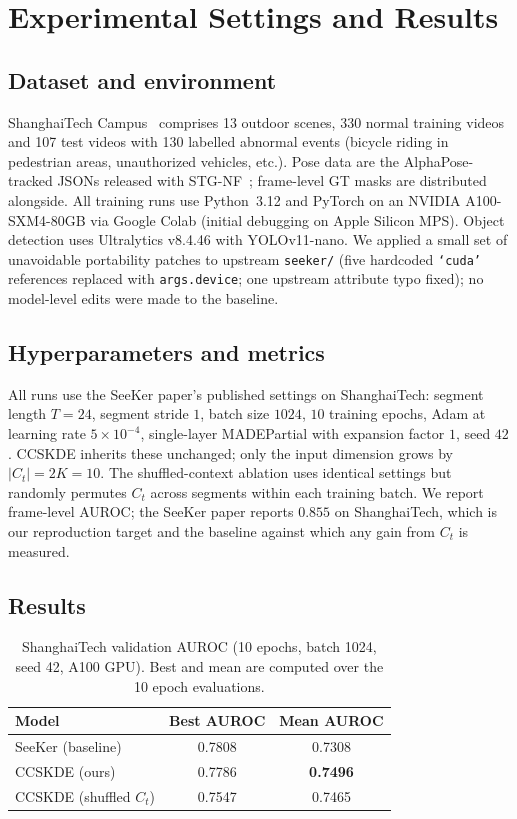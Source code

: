 \documentclass{article}
\begin{document}
\section{Experimental Settings and Results}
\label{sec:experiments}

\subsection{Dataset and environment}
ShanghaiTech Campus~\citep{liu2018future} comprises 13 outdoor scenes,
330 normal training videos and 107 test videos with 130 labelled abnormal
events (bicycle riding in pedestrian areas, unauthorized vehicles, etc.).
Pose data are the AlphaPose-tracked JSONs released with
STG-NF~\citep{hirschorn2023normalizing}; frame-level GT masks are
distributed alongside. All training runs use Python~3.12 and PyTorch on
an NVIDIA A100-SXM4-80GB via Google Colab (initial debugging on Apple
Silicon MPS). Object detection uses Ultralytics v8.4.46 with YOLOv11-nano.
We applied a small set of unavoidable portability patches to upstream
\texttt{seeker/} (five hardcoded \texttt{`cuda'} references replaced with
\texttt{args.device}; one upstream attribute typo fixed); no model-level
edits were made to the baseline.

\subsection{Hyperparameters and metrics}
All runs use the SeeKer paper's published settings on ShanghaiTech:
segment length $T=24$, segment stride $1$, batch size $1024$, $10$ training
epochs, Adam at learning rate $5\times10^{-4}$, single-layer MADEPartial
with expansion factor $1$, seed $42$. CCSKDE inherits these unchanged;
only the input dimension grows by $|C_t| = 2K = 10$. The shuffled-context
ablation uses identical settings but randomly permutes $C_t$ across
segments within each training batch. We report frame-level AUROC; the
SeeKer paper reports $0.855$ on ShanghaiTech, which is our reproduction
target and the baseline against which any gain from $C_t$ is measured.

\subsection{Results}

\begin{table}[h]
\centering
\caption{ShanghaiTech validation AUROC (10 epochs, batch 1024, seed 42,
A100 GPU). Best and mean are computed over the 10 epoch evaluations.}
\label{tab:results}
\begin{tabular}{lcc}
\toprule
Model & Best AUROC & Mean AUROC \\
\midrule
SeeKer (baseline) & 0.7808 & 0.7308 \\
CCSKDE (ours) & 0.7786 & \textbf{0.7496} \\
CCSKDE (shuffled $C_t$) & 0.7547 & 0.7465 \\
\bottomrule
\end{tabular}
\end{table}
\end{document}
